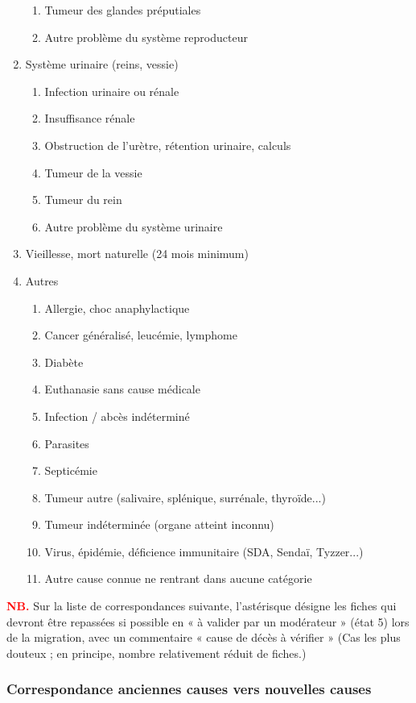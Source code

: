 \documentclass[a4paper,10pt]{article}
\newcommand\desire[1]{\noindent\textbf{\textcolor{red}{#1}}}
\begin{document}
\begin{enumerate}
\begin{enumerate}
\item Tumeur des glandes préputiales
\item Autre problème du système reproducteur
\end{enumerate}
\item Système urinaire (reins, vessie)
\begin{enumerate}
\item Infection urinaire ou rénale
\item Insuffisance rénale
\item Obstruction de l’urètre, rétention urinaire, calculs
\item Tumeur de la vessie
\item Tumeur du rein
\item Autre problème du système urinaire
\end{enumerate}
\item Vieillesse, mort naturelle (24 mois minimum)
\item Autres
\begin{enumerate}
\item Allergie, choc anaphylactique
\item Cancer généralisé, leucémie, lymphome
\item Diabète
\item Euthanasie sans cause médicale
\item Infection / abcès indéterminé
\item Parasites
\item Septicémie
\item Tumeur autre (salivaire, splénique, surrénale, thyroïde...)
\item Tumeur indéterminée (organe atteint inconnu)
\item Virus, épidémie, déficience immunitaire (SDA, Sendaï, Tyzzer...)
\item Autre cause connue ne rentrant dans aucune catégorie
\end{enumerate}
\end{enumerate}

\desire{NB.} Sur la liste de correspondances suivante, l'astérisque désigne les fiches qui devront être repassées si possible en « à valider par un modérateur » (état 5) lors de la migration, avec un commentaire « cause de décès à vérifier » (Cas les plus douteux ; en principe, nombre relativement réduit de fiches.)  

\subsubsection{Correspondance anciennes causes vers nouvelles causes}
\small
\end{document}
